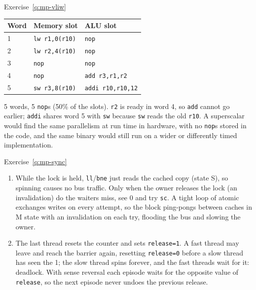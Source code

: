 \begin{noot}{Exercise~\ref{q:mp-vliw}}
\begin{center}
\small
\begin{tabular}{@{}lll@{}}
\toprule
Word & Memory slot & ALU slot \\
\midrule
1 & \texttt{lw r1,0(r10)} & \texttt{nop} \\
2 & \texttt{lw r2,4(r10)} & \texttt{nop} \\
3 & \texttt{nop} & \texttt{nop} \\
4 & \texttt{nop} & \texttt{add r3,r1,r2} \\
5 & \texttt{sw r3,8(r10)} & \texttt{addi r10,r10,12} \\
\bottomrule
\end{tabular}
\end{center}
5 words, 5 \texttt{nop}s (50\% of the slots). \texttt{r2} is ready in word 4, so
\texttt{add} cannot go earlier; \texttt{addi} shares word 5 with \texttt{sw} because
\texttt{sw} reads the old \texttt{r10}. A superscalar would find the same
parallelism at run time in hardware, with no \texttt{nop}s stored in the code, and the
same binary would still run on a wider or differently timed implementation.
\end{noot}

\begin{noot}{Exercise~\ref{q:mp-sync}}
\begin{enumerate}[label=(\alph*),leftmargin=*]
  \item While the lock is held, \texttt{ll}/\texttt{bne} just reads the cached copy
  (state S), so spinning causes no bus traffic. Only when the owner releases the lock
  (an invalidation) do the waiters miss, see 0 and try \texttt{sc}. A tight loop of
  atomic exchanges writes on every attempt, so the block ping-pongs between caches in
  M state with an invalidation on each try, flooding the bus and slowing the owner.
  \item The last thread resets the counter and sets \texttt{release=1}. A fast
  thread may leave and reach the barrier again, resetting \texttt{release=0} before a
  slow thread has seen the 1; the slow thread spins forever, and the fast threads
  wait for it: deadlock. With sense reversal each episode waits for the opposite
  value of \texttt{release}, so the next episode never undoes the previous release.
\end{enumerate}
\end{noot}

